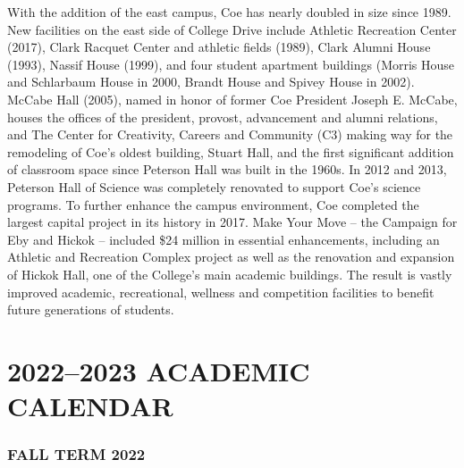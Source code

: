 \documentclass[
  letterpaper,
]{scrbook}
\renewcommand{\part}[1]{\addcontentsline{toc}{part}{#1}}
\begin{document}
With the addition of the east campus, Coe has nearly doubled in size
since 1989. New facilities on the east side of College Drive include
Athletic Recreation Center (2017), Clark Racquet Center and athletic
fields (1989), Clark Alumni House (1993), Nassif House (1999), and four
student apartment buildings (Morris House and Schlarbaum House in 2000,
Brandt House and Spivey House in 2002). McCabe Hall (2005), named in
honor of former Coe President Joseph E. McCabe, houses the offices of
the president, provost, advancement and alumni relations, and The Center
for Creativity, Careers and Community (C3) making way for the remodeling
of Coe's oldest building, Stuart Hall, and the first significant
addition of classroom space since Peterson Hall was built in the 1960s.
In 2012 and 2013, Peterson Hall of Science was completely renovated to
support Coe's science programs. To further enhance the campus
environment, Coe completed the largest capital project in its history in
2017. Make Your Move -- the Campaign for Eby and Hickok -- included \$24
million in essential enhancements, including an Athletic and Recreation
Complex project as well as the renovation and expansion of Hickok Hall,
one of the College's main academic buildings. The result is vastly
improved academic, recreational, wellness and competition facilities to
benefit future generations of students.

\part{ACADEMIC RESOURCES}

\chapter{2022--2023 ACADEMIC CALENDAR}\label{sec-academic-calenar}

\subsection{FALL TERM 2022}\label{fall-term-2022}
\end{document}

